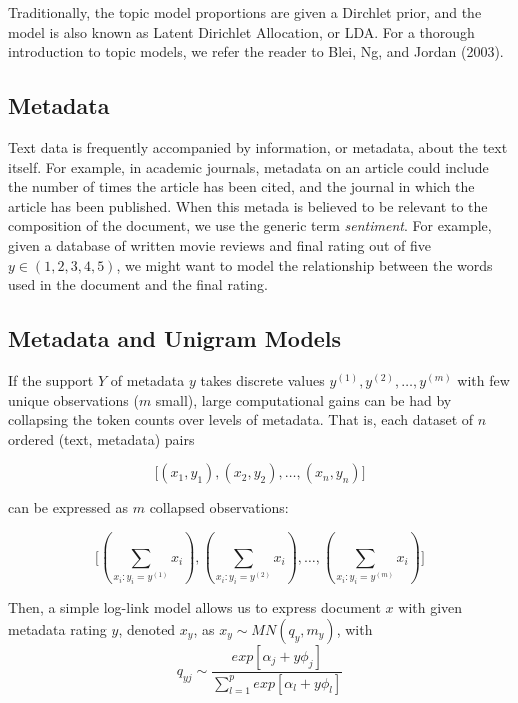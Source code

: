 \documentclass[12pt]{article}
\begin{document}
Traditionally, the topic model proportions are given a Dirchlet prior, and the model is also known as Latent Dirichlet Allocation, or LDA. 
For a thorough introduction to topic models, we refer the reader to Blei, Ng, and Jordan (2003). 

\subsection{Metadata}\label{metadata}

Text data is frequently accompanied by information, or metadata, about
the text itself. For example, in academic journals, metadata on an
article could include the number of times the article has been cited,
and the journal in which the article has been published. When this
metada is believed to be relevant to the composition of the document, we
use the generic term \emph{sentiment}. For example, given a database of
written movie reviews and final rating out of five $y \in (1,2,3,4,5)$,
we might want to model the relationship between the words used in the
document and the final rating.

\subsection{Metadata and Unigram Models}

If the support $Y$ of metadata $y$ takes discrete values $y^{(1)}, y^{(2)}, \dots, y^{(m)}$ with few unique observations ($m$ small), large computational gains can be had by collapsing the token counts over levels of metadata.  That is, each dataset of $n$ ordered (text, metadata) pairs

\begin{equation}
\big[ (x_1,y_1), (x_2,y_2), \dots , (x_n,y_n) \big]
\end{equation}

can be expressed as $m$ collapsed observations:

\begin{equation}
\big[  (\sum_{x_i : y_i = y^{(1)}}{x_i}) , (\sum_{x_i : y_i = y^{(2)}}{x_i}), \dots,  (\sum_{x_i : y_i = y^{(m)}}{x_i})  \big]
\end{equation}

Then, a simple log-link model allows us to express document $x$ with given metadata rating $y$,
denoted $x_y$, as $x_y \sim MN(q_y,m_y)$, with
\begin{equation}
q_{yj} \sim \frac{exp[\alpha_j + y \phi_j]}{\sum_{l=1}^{p} exp[\alpha_l + y \phi_l]}
\end{equation}
\end{document}
